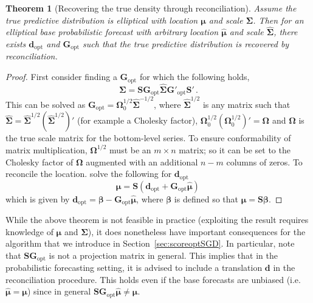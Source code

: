 \documentclass[11pt]{article}
\newtheorem{theo}{Theorem}[section]
\theoremstyle{definition}
\begin{document}
\begin{theo}[Recovering the true density through reconciliation]\label{theo:OptRec}
	Assume the true predictive distribution is elliptical with location ${\bm\mu}$ and scale ${\bm\Sigma}$. Then for an elliptical base probabilistic forecast with arbitrary location $\hat{\bm\mu}$ and scale $\hat{\bm\Sigma}$, there exists $\bm{d}_{\text{opt}}$ and $\bm{G}_{\text{opt}}$ such that the true predictive distribution is recovered by reconciliation.
\end{theo}
\begin{proof}
	First consider finding a $\bm{G}_{\text{opt}}$ for which the following holds,
	\begin{equation*}
	\bm{\Sigma}=\bm{S}\bm{G}_{\text{opt}}\hat{\bm{\Sigma}}\bm{G}'_{\text{opt}}\bm{S}'\,.
	\end{equation*}
	This can be solved as $\bm{G}_{\text{opt}}=\bm{\Omega}_0^{1/2}\hat{\bm{\Sigma}}^{-1/2}$, where $\hat{\bm{\Sigma}}^{1/2}$ is any matrix such that $\hat{\bm{\Sigma}}=\hat{\bm{\Sigma}}^{1/2}(\hat{\bm{\Sigma}}^{1/2})'$ (for example a Cholesky factor), ${\bm{\Omega}}_0^{1/2}({\bm{\Omega}}_0^{1/2})'={\bm\Omega}$ and ${\bm\Omega}$ is the true scale matrix for the bottom-level series. To ensure conformability of matrix multiplication, ${\bm{\Omega}}^{1/2}$ must be an $m\times n$ matrix; so it can be set to the Cholesky factor of ${\bm{\Omega}}$ augmented with an additional $n-m$ columns of zeros. To reconcile the location. solve the following for $\bm{d}_{\text{opt}}$
	\begin{equation*}
	\bm{\mu}=\bm{S}(\bm{d}_{\text{opt}}+\bm{G}_{\text{opt}}\hat{\bm{\mu}})\,
	\end{equation*}
	which is given by $\bm{d}_{\text{opt}}=\bm{\beta}-\bm{G}_{\text{opt}}\hat{\bm\mu}$, where $\bm{\beta}$ is defined so that $\bm{\mu}=\bm{S}\bm{\beta}$.
\end{proof}

While the above theorem is not feasible in practice (exploiting the result requires knowledge of $\bm{\mu}$ and $\bm{\Sigma}$), it does nonetheless have important consequences for the algorithm that we introduce in Section~\ref{sec:scoreoptSGD}. In particular, note that $\bm{S}\bm{G}_{\text{opt}}$ is not a projection matrix in general. This implies that in the probabilistic forecasting setting, it is advised to include a translation $\bm{d}$ in the reconciliation procedure. This holds even if the base forecasts are unbiased (i.e. $\hat{\bm{\mu}}=\bm{\mu}$) since in general $\bm{S}\bm{G}_{\text{opt}}\hat{\bm{\mu}}\neq\bm{\mu}$.
\end{document}
